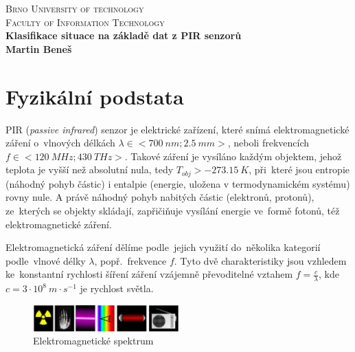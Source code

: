 \documentclass[10pt,a4paper,titlepage]{article}
\begin{document}

  \begin{titlepage}

  \begin{center}
  \textsc{\LARGE Brno University of technology}\\[0.5cm]
  \textsc{\large Faculty of Information Technology}\\[9cm]
  
  { \Large \bfseries Klasifikace situace na základě dat z PIR senzorů}\\[0.3cm]
  { \bfseries Martin Beneš}\\[1cm]
  \end{center}
  \end{titlepage}
  \newpage

  \tableofcontents
  \newpage

  \section{Fyzikální podstata}
  PIR ({\it passive infrared}) senzor je elektrické zařízení, které snímá elektromagnetické záření
  o~vlnových délkách $\lambda\in<700~nm;2.5~mm>$, neboli frekvencích $f\in<120~MHz;430~THz>$.
  Takové záření je vysíláno každým objektem, jehož teplota je vyšší než absolutní nula, tedy
  $T_{obj}>-273.15~K$, při~které jsou entropie (náhodný pohyb částic) i entalpie (energie, uložena
  v termodynamickém systému) rovny nule. A právě náhodný pohyb nabitých částic (elektronů, protonů),
  ze~kterých se objekty skládají, zapřičiňuje vysílání energie ve~formě fotonů, též elektromagnetické
  záření.

  Elektromagnetická záření dělíme podle~jejich využití do~několika kategorií podle~vlnové délky $\lambda$,
  popř.~frekvence $f$. Tyto dvě charakteristiky jsou vzhledem ke~konstantní rychlosti šíření záření
  vzájemně převoditelné vztahem $f=\frac{c}{\lambda}$, kde~$c=3\cdot10^{8}~m\cdot s^{-1}$ je rychlost světla. 

  \begin{figure}[h!]
    \begin{center}
      \includegraphics[width=0.5\textwidth]{spectrum.png}
      \caption[title=Obrazek]{Elektromagnetické spektrum\label{fig:spectrum} \cite{IZGcolors}}
    \end{center}    
  \end{figure}
\end{document}
